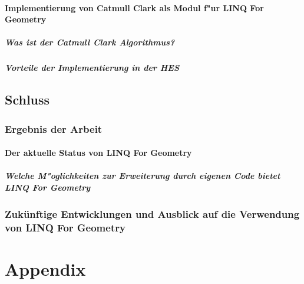 \documentclass[pagesize, paper=a4, fontsize=12pt,titlepage=true, headings=small, headnosepline, abstractoff, liststotoc, nochapterprefix, plainheadsepline]{scrreprt}
\newcommand{\LFG}{LINQ For Geometry}
\begin{document}
		\subsection {Implementierung von Catmull Clark als Modul f"ur \LFG}
			\subsubsection {Was ist der Catmull Clark Algorithmus?}
			\subsubsection {Vorteile der Implementierung in der HES}





\chapter {Schluss}
	\section {Ergebnis der Arbeit}
		\subsection {Der aktuelle Status von \LFG}
			\subsubsection {Welche M"oglichkeiten zur Erweiterung durch eigenen Code bietet \LFG}
	\section {Zukünftige Entwicklungen und Ausblick auf die Verwendung von \LFG}



\part*{Appendix}
\lstlistoflistings
\newpage
\end{document}
